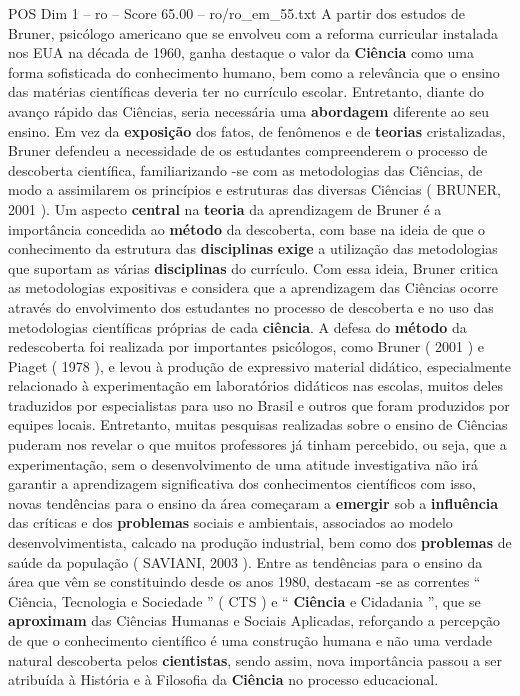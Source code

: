\begin{textsample}{POS Dim 1 – ro – Score 65.00 – ro/ro\_em\_55.txt}
A partir dos estudos de Bruner, psicólogo americano que se envolveu com a reforma curricular instalada nos EUA na década de 1960, ganha destaque o valor da \textbf{Ciência} como uma forma sofisticada do conhecimento humano, bem como a relevância que o ensino das matérias científicas deveria ter no currículo escolar.
Entretanto, diante do avanço rápido das Ciências, seria necessária uma \textbf{abordagem} diferente ao seu ensino.
Em vez da \textbf{exposição} dos fatos, de fenômenos e de \textbf{teorias} cristalizadas, Bruner defendeu a necessidade de os estudantes compreenderem o processo de descoberta científica, familiarizando -se com as metodologias das Ciências, de modo a assimilarem os princípios e estruturas das diversas Ciências ( BRUNER, 2001 ).
Um aspecto \textbf{central} na \textbf{teoria} da aprendizagem de Bruner é a importância concedida ao \textbf{método} da descoberta, com base na ideia de que o conhecimento da estrutura das \textbf{disciplinas} \textbf{exige} a utilização das metodologias que suportam as várias \textbf{disciplinas} do currículo.
Com essa ideia, Bruner critica as metodologias expositivas e considera que a aprendizagem das Ciências ocorre através do envolvimento dos estudantes no processo de descoberta e no uso das metodologias científicas próprias de cada \textbf{ciência}.
A defesa do \textbf{método} da redescoberta foi realizada por importantes psicólogos, como Bruner ( 2001 ) e Piaget ( 1978 ), e levou à produção de expressivo material didático, especialmente relacionado à experimentação em laboratórios didáticos nas escolas, muitos deles traduzidos por especialistas para uso no Brasil e outros que foram produzidos por equipes locais.
Entretanto, muitas pesquisas realizadas sobre o ensino de Ciências puderam nos revelar o que muitos professores já tinham percebido, ou seja, que a experimentação, sem o desenvolvimento de uma atitude investigativa não irá garantir a aprendizagem significativa dos conhecimentos científicos com isso, novas tendências para o ensino da área começaram a \textbf{emergir} sob a \textbf{influência} das críticas e dos \textbf{problemas} sociais e ambientais, associados ao modelo desenvolvimentista, calcado na produção industrial, bem como dos \textbf{problemas} de saúde da população ( SAVIANI, 2003 ).
Entre as tendências para o ensino da área que vêm se constituindo desde os anos 1980, destacam -se as correntes “ Ciência, Tecnologia e Sociedade ” ( CTS ) e “ \textbf{Ciência} e Cidadania ”, que se \textbf{aproximam} das Ciências Humanas e Sociais Aplicadas, reforçando a percepção de que o conhecimento científico é uma construção humana e não uma verdade natural descoberta pelos \textbf{cientistas}, sendo assim, nova importância passou a ser atribuída à História e à Filosofia da \textbf{Ciência} no processo educacional.

\end{textsample}
